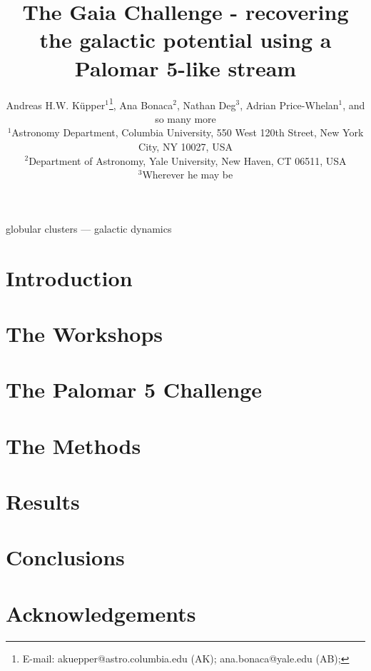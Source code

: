 \documentclass[useAMS,usenatbib]{mn2e}
\title[Gaia Challenge - Palomar 5]{The Gaia Challenge - recovering the galactic potential using a Palomar
5-like stream}
\author[K\"upper et al.]
{Andreas H.W. K\"{u}pper$^{1}$\thanks{
E-mail: \mbox{akuepper@astro.columbia.edu} (AK);
 \mbox{ana.bonaca@yale.edu} (AB);}, Ana Bonaca$^{2}$, Nathan Deg$^{3}$, Adrian Price-Whelan$^{1}$, \newauthor
and so many more\\
$^{1}$Astronomy Department, Columbia University, 550 West 120th Street, New York City, NY 10027, USA\\
$^{2}$Department of Astronomy, Yale University, New Haven, CT 06511, USA\\
$^{3}$Wherever he may be\\
}
\begin{document}


\maketitle

\label{firstpage}

\begin{abstract}

\end{abstract}




\begin{keywords}
globular clusters --- galactic dynamics
\end{keywords}





\section{Introduction}



\section{The Workshops}



\section{The Palomar 5 Challenge}



\section{The Methods}



\section{Results}



\section{Conclusions}



\section*{Acknowledgements}


\begin{thebibliography}{99}

\end{thebibliography}



\bsp \label{lastpage} 
\end{document}
